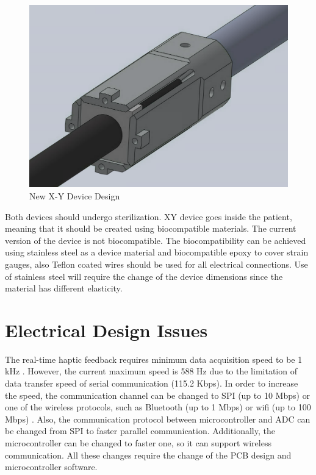 \begin{figure}[h]
	\begin{center}
		\includegraphics[width=120mm]{fig/methods/new_xy_dev.png}
	\end{center}
	\vspace{-4mm}
	\caption[New X-Y Device Design]
	{New X-Y Device Design}
	\label{fig:NewXYDesign}
	\vspace{-2mm}
\end{figure}
	
	Both devices should undergo sterilization. XY device goes inside the patient, meaning that it should be created using biocompatible materials. The current version of the device is not biocompatible. The biocompatibility can be achieved using stainless steel as a device material and biocompatible epoxy to cover strain gauges, also Teflon coated wires should be used for all electrical connections. Use of stainless steel will require the change of the device dimensions since the material has different elasticity.
	
\section{Electrical Design Issues}
	The real-time haptic feedback requires minimum data acquisition speed to be 1 kHz \cite{seungmoon_choi_effect_2004}. However, the current maximum speed is 588 Hz due to the limitation of data transfer speed of serial communication (115.2 Kbps). In order to increase the speed, the communication channel can be changed to SPI (up to 10 Mbps) \cite{_uart_porotocol} or one of the wireless protocols, such as Bluetooth (up to 1 Mbps) or wifi (up to 100 Mbps) \cite{_wireless_protocols}. Also, the communication protocol between microcontroller and ADC can be changed from SPI to faster parallel communication. Additionally, the microcontroller can be changed to faster one, so it can support wireless communication. All these changes require the change of the PCB design and microcontroller software. 
    

